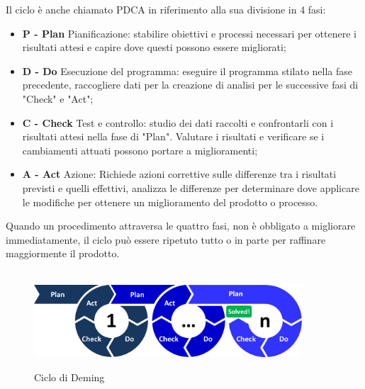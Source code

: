 \documentclass[../piano-di-qualifica.tex]{subfiles}
\begin{document}
Il ciclo è anche chiamato PDCA in riferimento alla sua divisione in 4 fasi:
\begin{itemize}
    \item \textbf{P - Plan} Pianificazione: stabilire obiettivi e processi necessari per ottenere i risultati attesi e capire dove questi possono essere migliorati;
    \item \textbf{D - Do} Esecuzione del programma: eseguire il programma stilato nella fase precedente, raccogliere dati per la creazione di analisi per le successive fasi di "Check" e "Act";
    \item \textbf{C - Check} Test e controllo: studio dei dati raccolti e confrontarli con i risultati attesi nella fase di "Plan". Valutare i risultati e verificare se i cambiamenti attuati possono portare a miglioramenti;
    \item \textbf{A - Act} Azione: Richiede azioni correttive sulle differenze tra i risultati previsti e quelli effettivi, analizza le differenze per determinare dove applicare le modifiche per ottenere un miglioramento del prodotto o processo.
\end{itemize}
Quando un procedimento attraversa le quattro fasi, non è obbligato a migliorare immediatamente, il ciclo può essere ripetuto tutto o in parte per raffinare maggiormente il prodotto.
\\ \\
\begin{figure}[H]
    \centering
    \includegraphics[width=10cm]{img/ciclo_di_deming.png}
    \label{fig:ciclo_di_deming}
    \caption{Ciclo di Deming}
\end{figure}
\end{document}
